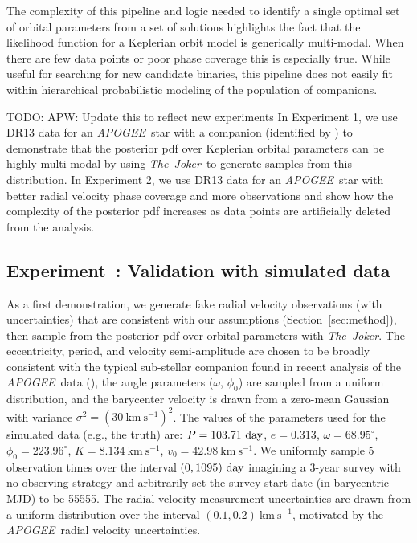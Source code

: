 \documentclass[manuscript, letterpaper]{aastex6}
\newcommand{\project}[1]{\textsl{#1}}
\newcommand{\acronym}[1]{{\small{#1}}}
\newcommand{\apogee}{\project{\acronym{APOGEE}}}
\newcommand{\samplername}{\project{The~Joker}}
\newcommand{\sectionname}{Section}
\newcommand{\kms}{\mathrm{km}~\mathrm{s}^{-1}}
\newcounter{expcounter}
\newcommand{\todo}[1]{{\color{red}TODO: #1}}
\begin{document}
The complexity of this pipeline and logic needed to identify a single optimal
set of orbital parameters from a set of solutions highlights the fact that the
likelihood function for a Keplerian orbit model is generically multi-modal.
When there are few data points or poor phase coverage this is especially true.
While useful for searching for new candidate binaries, this pipeline does not
easily fit within hierarchical probabilistic modeling of the population of
companions.

\todo{APW: Update this to reflect new experiments}
In Experiment 1, we use DR13 data for an \apogee\ star with a companion
(identified by \citealt{Troup:2016}) to demonstrate that the posterior pdf over
Keplerian orbital parameters can be highly multi-modal by using \samplername\
to generate samples from this distribution.
In Experiment 2, we use DR13 data for an \apogee\ star with better radial
velocity phase coverage and more observations and show how the complexity of
the posterior pdf increases as data points are artificially deleted from the
analysis.

\subsection{Experiment~: Validation with simulated data}
\label{sec:validation}

As a first demonstration, we generate fake radial velocity observations (with
uncertainties) that are consistent with our assumptions
(\sectionname~\ref{sec:method}), then sample from the posterior pdf over orbital
parameters with \samplername.
The eccentricity, period, and velocity semi-amplitude are chosen to be broadly
consistent with the typical sub-stellar companion found in recent analysis of
the \apogee\ data (\citealt{Troup:2016}), the angle parameters ($\omega$,
$\phi_0$) are sampled from a uniform distribution, and the barycenter velocity
is drawn from a zero-mean Gaussian with variance $\sigma^2 = (30~\kms)^2$.
The values of the parameters used for the simulated data (e.g., the truth) are:
$P = 103.71~{\rm day}$, $e = 0.313$, $\omega = 68.95^\circ$,
$\phi_0 = 223.96^\circ$, $K = 8.134~\kms$, $v_0 = 42.98~\kms$.
We uniformly sample 5 observation times over the interval $(0,1095)~{\rm day}$
imagining a 3-year survey with no observing strategy and arbitrarily set the
survey start date (in barycentric MJD) to be 55555.
The radial velocity measurement uncertainties are drawn from a uniform
distribution over the interval $(0.1, 0.2)~\kms$, motivated by the \apogee\
radial velocity uncertainties.
\end{document}

